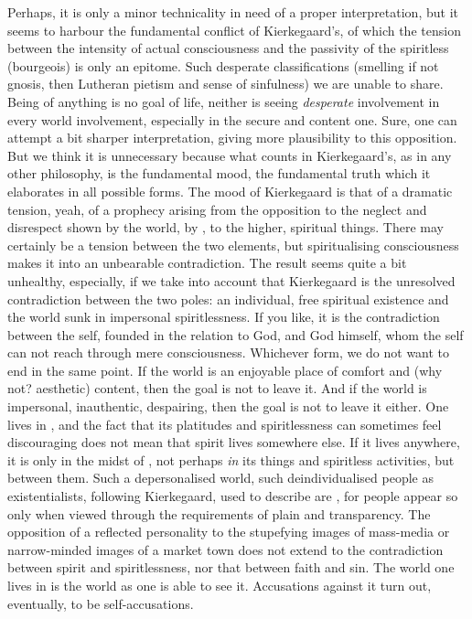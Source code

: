 Perhaps, it is only a minor technicality in need of a proper
interpretation, but it seems to harbour the fundamental conflict of
Kierkegaard's, of which the tension between the intensity of actual
consciousness and the passivity of the spiritless (bourgeois) is only an
epitome.   Such desperate classifications 
(smelling if not gnosis, then Lutheran pietism and sense of sinfulness)
we are unable to share. Being  of anything is no goal of life, neither is seeing {\em desperate} 
involvement in every world involvement, especially in the secure and content
one. Sure, one can attempt a bit sharper interpretation, giving more
plausibility to this opposition. But we think it is unnecessary because what
counts in Kierkegaard's, as in any other philosophy, is the fundamental mood,
the fundamental truth which it elaborates in all possible forms.  The mood of
Kierkegaard is that of a dramatic tension, yeah, of a prophecy arising from the
opposition to the neglect and disrespect shown by the world, by , to the higher, spiritual 
things.  There may certainly be a tension between the two
elements, but spiritualising consciousness makes it into an unbearable 
contradiction.  The result seems quite a bit unhealthy, especially, if we take
into account that  Kierkegaard is the unresolved
contradiction between the two poles: an individual, free spiritual existence and the
world sunk in impersonal spiritlessness. If you like, it is the contradiction
between the self, founded in the relation to God, and God himself, whom the self
can not reach through mere consciousness. Whichever form, we do not want to end in the
same point. If the world is an enjoyable place of comfort and (why not?
aesthetic) content, then the goal is not to leave it. And if the world is
impersonal, inauthentic, despairing, then the goal is not to leave it either.
One lives in , and the fact that its platitudes and
spiritlessness can sometimes feel discouraging does not mean that spirit lives
somewhere else. If it lives anywhere, it is only in the midst of , not perhaps {\em in} its  things and spiritless
activities, but between them. Such a depersonalised world, such deindividualised
people as 
existentialists, following Kierkegaard, used to describe are , for people appear so
only when viewed through the requirements of plain  and
transparency. The opposition of a reflected personality to the stupefying images
of mass-media or narrow-minded images of a market town does not extend to the
contradiction between spirit and spiritlessness, nor that between
faith and sin. The world one lives in is the world as one is able to see
it. Accusations against it turn out, eventually, to be self-accusations. 

